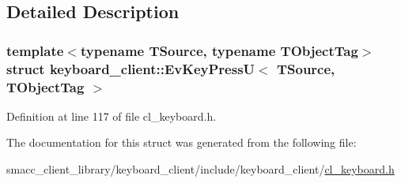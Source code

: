 \subsection{Detailed Description}
\subsubsection*{template$<$typename T\+Source, typename T\+Object\+Tag$>$\newline
struct keyboard\+\_\+client\+::\+Ev\+Key\+Press\+U$<$ T\+Source, T\+Object\+Tag $>$}



Definition at line 117 of file cl\+\_\+keyboard.\+h.



The documentation for this struct was generated from the following file\+:\begin{DoxyCompactItemize}
\item 
smacc\+\_\+client\+\_\+library/keyboard\+\_\+client/include/keyboard\+\_\+client/\hyperlink{cl__keyboard_8h}{cl\+\_\+keyboard.\+h}\end{DoxyCompactItemize}
